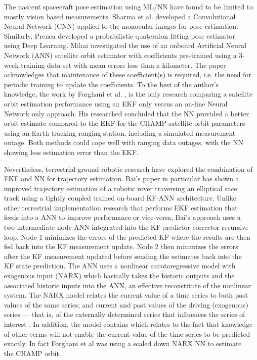 The nascent spacecraft pose estimation using ML/NN have found to be limited to mostly vision based measurements. Sharma et al. \cite{sharmePoseNonCYYb} developed a Convolutional Neural Network (CNN) applied to the monocular images for pose estimation. Similarly, Prenca \cite{prencaDlPosePhotorealistic19} developed a probabilistic quaternion fitting pose estimator using Deep Learning. Mihai \cite{mihaiPoseAnn20} investigated the use of an onboard Artificial Neural Network (ANN) satellite orbit estimator with coefficients pre-trained using a 3-week training data set with mean errors less than a kilometer. The paper acknowledges that maintenance of these coefficient(s) is required, i.e. the need for periodic training to update the coefficients. To the best of the author's knowledge, the work by Forghani et al. \cite{ForghaniOrbitNN11},  is the only research comparing a satellite orbit estimation performance using an EKF only versus an on-line Neural Network only approach. His researched concluded that the NN provided a better orbit estimate compared to the EKF for the CHAMP satellite orbit parameters using an Earth tracking ranging station, including a simulated measurement outage. Both methods could cope well with ranging data outages, with the NN showing less estimation error than the EKF.

Nevertheless, terrestrial ground robotic research have explored the combination of EKF and NN for trajectory estimation. Bai's \cite{baiKf20} paper in particular has shown a improved trajectory estimation of a robotic rover traversing an elliptical race track using a tightly coupled trained on-board KF-ANN architecture. Unlike other terrestrial implementation research that performs EKF estimation that feeds into a ANN to improve performance or vice-versa, Bai's approach uses a two intermediate node ANN integrated into the KF predictor-corrector recursive loop. Node 1 minimizes the errors of the predicted KF where the results are then fed back into the KF measurement update. Node 2 then minimizes the errors after the KF measurement updated before sending the estimates back into the KF state prediction. The ANN uses a nonlinear aurotoregressive model with exogenous input (NARX) which basically takes the historic outputs and the associated historic inputs into the ANN, an effective reconstitute of the nonlinear system. The NARX model relates the current value of a time series to both past values of the same series; and current and past values of the driving (exogenous) series — that is, of the externally determined series that influences the series of interest \cite{menezesNarx20083335, baiCompund19}. In addition, the model contains which relates to the fact that knowledge of other terms will not enable the current value of the time series to be predicted exactly. In fact Forghani et al \cite{ForghaniOrbitNN11} was using a scaled down NARX NN to estimate the CHAMP orbit.     

